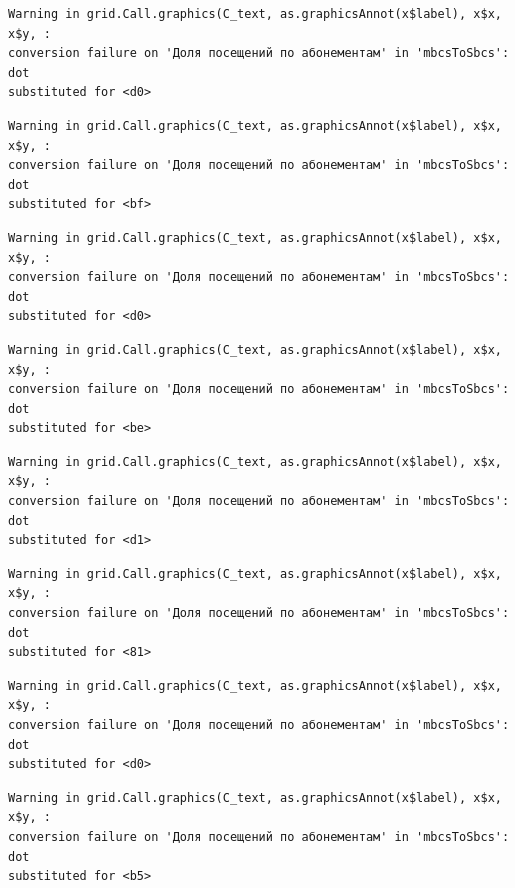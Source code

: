 \documentclass[
  letterpaper,
  DIV=11,
  numbers=noendperiod]{scrartcl}
\begin{document}
\begin{verbatim}
Warning in grid.Call.graphics(C_text, as.graphicsAnnot(x$label), x$x, x$y, :
conversion failure on 'Доля посещений по абонементам' in 'mbcsToSbcs': dot
substituted for <d0>
\end{verbatim}

\begin{verbatim}
Warning in grid.Call.graphics(C_text, as.graphicsAnnot(x$label), x$x, x$y, :
conversion failure on 'Доля посещений по абонементам' in 'mbcsToSbcs': dot
substituted for <bf>
\end{verbatim}

\begin{verbatim}
Warning in grid.Call.graphics(C_text, as.graphicsAnnot(x$label), x$x, x$y, :
conversion failure on 'Доля посещений по абонементам' in 'mbcsToSbcs': dot
substituted for <d0>
\end{verbatim}

\begin{verbatim}
Warning in grid.Call.graphics(C_text, as.graphicsAnnot(x$label), x$x, x$y, :
conversion failure on 'Доля посещений по абонементам' in 'mbcsToSbcs': dot
substituted for <be>
\end{verbatim}

\begin{verbatim}
Warning in grid.Call.graphics(C_text, as.graphicsAnnot(x$label), x$x, x$y, :
conversion failure on 'Доля посещений по абонементам' in 'mbcsToSbcs': dot
substituted for <d1>
\end{verbatim}

\begin{verbatim}
Warning in grid.Call.graphics(C_text, as.graphicsAnnot(x$label), x$x, x$y, :
conversion failure on 'Доля посещений по абонементам' in 'mbcsToSbcs': dot
substituted for <81>
\end{verbatim}

\begin{verbatim}
Warning in grid.Call.graphics(C_text, as.graphicsAnnot(x$label), x$x, x$y, :
conversion failure on 'Доля посещений по абонементам' in 'mbcsToSbcs': dot
substituted for <d0>
\end{verbatim}

\begin{verbatim}
Warning in grid.Call.graphics(C_text, as.graphicsAnnot(x$label), x$x, x$y, :
conversion failure on 'Доля посещений по абонементам' in 'mbcsToSbcs': dot
substituted for <b5>
\end{verbatim}
\end{document}
